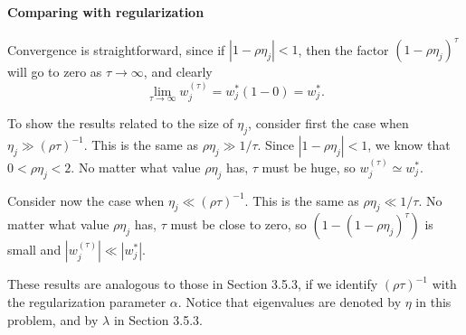 \documentclass[12pt, a4paper]{article}
\newcommand{\abs}[1]{\left\lvert#1\right\rvert}
\begin{document}
\paragraph{Comparing with regularization}
Convergence is straightforward, since if $\abs{1- \rho \eta_j} < 1$, then the factor $(1- \rho \eta_j)^\tau$ will go to zero as $\tau \to \infty$, and clearly
\begin{equation*}
	\lim\limits_{\tau \to \infty} w^{(\tau)}_j = w^{*}_j \left( 1 - 0 \right) = w^{*}_j.
\end{equation*}

To show the results related to the size of $\eta_j$, consider first the case when $\eta_j \gg (\rho \tau)^{-1}$.
This is the same as $\rho \eta_j \gg 1 / \tau$.
Since $\abs{1- \rho \eta_j} < 1$, we know that $0 < \rho \eta_j < 2$.
No matter what value $\rho \eta_j$ has, $\tau$ must be huge, so $w_j^{(\tau)} \simeq w_j^{*}$.

Consider now the case when $\eta_j \ll (\rho \tau)^{-1}$.
This is the same as $\rho \eta_j \ll 1 / \tau$.
No matter what value $\rho \eta_j$ has, $\tau$ must be close to zero, so $\left( 1 - (1- \rho \eta_j)^\tau \right)$ is small and $\abs{w_j^{(\tau)}} \ll \abs{w_j^{*}}$.

These results are analogous to those in Section 3.5.3, if we identify $(\rho \tau)^{-1}$ with the regularization parameter $\alpha$.
Notice that eigenvalues are denoted by $\eta$ in this problem, and by $\lambda$ in Section 3.5.3.
\end{document}
